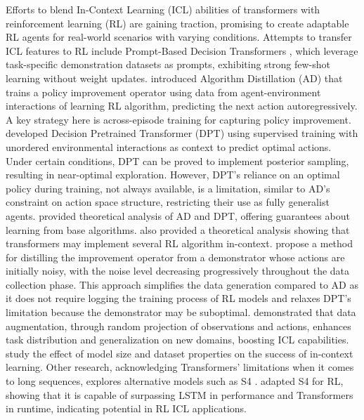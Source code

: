 Efforts to blend In-Context Learning (ICL) abilities of transformers with reinforcement learning (RL) are gaining traction, promising to create adaptable RL agents for real-world scenarios with varying conditions. Attempts to transfer ICL features to RL include Prompt-Based Decision Transformers \citep{xu2022prompting}, which leverage task-specific demonstration datasets as prompts, exhibiting strong few-shot learning without weight updates. \citet{laskin2022context} introduced Algorithm Distillation (AD) that trains a policy improvement operator using data from agent-environment interactions of learning RL algorithm, predicting the next action autoregressively. A key strategy here is across-episode training for capturing policy improvement. \citet{lee2023supervised} developed Decision Pretrained Transformer (DPT) using supervised training with unordered environmental interactions as context to predict optimal actions. Under certain conditions, DPT can be proved to implement posterior sampling, resulting in near-optimal exploration. However, DPT's reliance on an optimal policy during training, not always available, is a limitation, similar to AD's constraint on action space structure, restricting their use as fully generalist agents. \citet{lin2023transformers} provided theoretical analysis of AD and DPT, offering guarantees about learning from base algorithms. \citet{wang2024transformers} also provided a theoretical analysis showing that transformers may implement several RL algorithm in-context. \citet{zisman2023emergence} propose a method for distilling the improvement operator from a demonstrator whose actions are initially noisy, with the noise level decreasing progressively throughout the data collection phase. This approach simplifies the data generation compared to AD as it does not require logging the training process of RL models and relaxes DPT's limitation because the demonstrator may be suboptimal. \citet{kirsch2023towards} demonstrated that data augmentation, through random projection of observations and actions, enhances task distribution and generalization on new domains, boosting ICL capabilities. \citet{raparthy2023generalization} study the effect of model size and dataset properties on the success of in-context learning. Other research, acknowledging Transformers' limitations when it comes to long sequences, explores alternative models such as S4 \citep{gu2021efficiently}. \citet{lu2023structured} adapted S4 for RL, showing that it is capable of surpassing LSTM in performance and Transformers in runtime, indicating potential in RL ICL applications.

